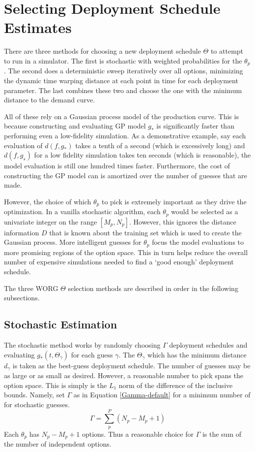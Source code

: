 \section{Selecting Deployment Schedule Estimates}
\label{selecting}

There are three methods for choosing a new deployment schedule $\Theta$ 
to attempt to run in a simulator. The first is stochastic with weighted
probabilities for the $\theta_p$.  The second does a deterministic sweep 
iteratively over all options, minimizing the dynamic time warping distance
at each point in time for each deployment parameter.  The last combines
these two and choose the one with the minimum distance to the demand curve.

All of these rely on a Gaussian process model of the production
curve. This is because constructing and evaluating GP model $g_*$ is 
significantly faster than performing even a low-fidelity simulation. 
As a demonstrative example, say each evaluation of $d(f, g_*)$ takes a tenth
of a second (which is excessively long) and $d(f, g_s)$ for a low fidelity
simulation takes ten seconds (which is reasonable), the model evaluation 
is still one hundred times faster.  Furthermore, the cost of constructing 
the GP model can is amortized over the number of guesses that are made.

However, the choice of which $\theta_p$ to pick is extremely important
as they drive the optimization. In a vanilla stochastic algorithm, 
each $\theta_p$ would be selected as a univariate integer on the 
range $[M_p, N_p]$.  However, this ignores the distance information $D$ 
that is known about the training set which is used to create the Gaussian 
process.
More intelligent guesses for $\theta_p$ focus the model 
evaluations to more promising regions of the option space.  This in turn 
helps reduce the overall number of expensive simulations needed to find 
a `good enough' deployment schedule.

The three WORG $\Theta$ selection methods are described in order in the 
following subsections.

\subsection{Stochastic Estimation}
\label{stochastic}

The stochastic method works by randomly choosing $\Gamma$ deployment 
schedules and evaluating $g_*(t, \Theta_\gamma)$ for each guess $\gamma$.
The $\Theta_\gamma$ which has the minimum distance $d_\gamma$ is 
taken as the best-guess deployment schedule.  The number of guesses may 
be as large or as small as desired.  However, a reasonable number to pick 
spans the option space. This is simply is the $L_1$ norm of the difference 
of the inclusive bounds. Namely, set $\Gamma$ as in Equation 
\ref{Gamma-default} for a minimum number of for stochastic guesses.
\begin{equation}
\label{Gamma-default}
\Gamma = \sum_p^P (N_p - M_p + 1)
\end{equation}
Each $\theta_p$ has $N_p - M_p + 1$ options. Thus a reasonable
choice for $\Gamma$ is the sum of the number of independent options.

